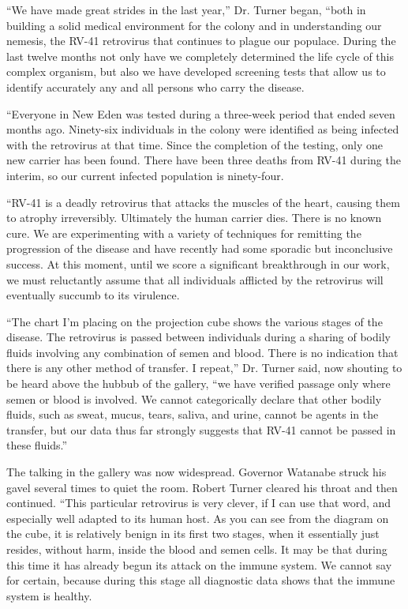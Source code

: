 \documentclass[]{article}
\begin{document}
{“We have made great strides in the last year,” Dr. Turner began, “both in building a solid medical environment for the colony and in understanding our nemesis, the RV-41 retrovirus that continues to plague our populace. During the last twelve months not only have we completely determined the life cycle of this complex organism, but also we have developed screening tests that allow us to identify accurately any and all persons who carry the disease.

“Everyone in New Eden was tested during a three-week period that ended seven months ago. Ninety-six individuals in the colony were identified as being infected with the retrovirus at that time. Since the completion of the testing, only one new carrier has been found. There have been three deaths from RV-41 during the interim, so our current infected population is ninety-four.

“RV-41 is a deadly retrovirus that attacks the muscles of the heart, causing them to atrophy irreversibly. Ultimately the human carrier dies. There is no known cure. We are experimenting with a variety of techniques for remitting the progression of the disease and have recently had some sporadic but inconclusive success. At this moment, until we score a significant breakthrough in our work, we must reluctantly assume that all individuals afflicted by the retrovirus will eventually succumb to its virulence.

“The chart I’m placing on the projection cube shows the various stages of the disease. The retrovirus is passed between individuals during a sharing of bodily fluids involving any combination of semen and blood. There is no indication that there is any other method of transfer. I repeat,” Dr. Turner said, now shouting to be heard above the hubbub of the gallery, “we have verified passage only where semen or blood is involved. We cannot categorically declare that other bodily fluids, such as sweat, mucus, tears, saliva, and urine, cannot be agents in the transfer, but our data thus far strongly suggests that RV-41 cannot be passed in these fluids.”

The talking in the gallery was now widespread. Governor Watanabe struck his gavel several times to quiet the room. Robert Turner cleared his throat and then continued. “This particular retrovirus is very clever, if I can use that word, and especially well adapted to its human host. As you can see from the diagram on the cube, it is relatively benign in its first two stages, when it essentially just resides, without harm, inside the blood and semen cells. It may be that during this time it has already begun its attack on the immune system. We cannot say for certain, because during this stage all diagnostic data shows that the immune system is healthy.

}
\end{document}
